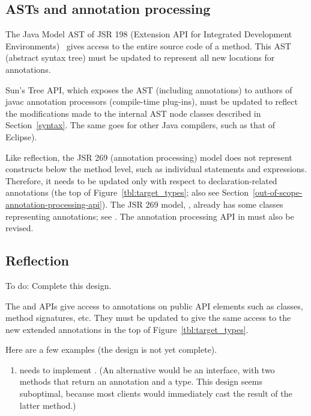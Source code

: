 \documentclass[10pt]{article}
\begin{document}
\subsection{ASTs and annotation processing\label{asts-and-annotation-processing}}

The Java Model AST of JSR 198 (Extension API for Integrated Development
Environments)~\cite{JSR198} gives access to the entire source code of a
method.  This AST (abstract syntax tree) must be updated to represent all
new locations for annotations.

Sun's Tree API, which exposes the AST (including annotations) to authors of
javac annotation processors (compile-time plug-ins), must be updated to
reflect the modifications made to the internal AST node classes described in
Section~\ref{syntax}.
The same goes for other Java compilers, such as that of Eclipse).


\label{jsr269-changes}

Like reflection, the JSR 269 (annotation processing) model
does not represent constructs below the
method level, such as individual statements and expressions.  Therefore, it
needs to be updated only with respect to declaration-related annotations
(the top of Figure~\ref{tbl:target_types}; also see Section~\ref{out-of-scope-annotation-processing-api}).
The JSR 269 model, ,
already has some classes representing annotations; see
.
The annotation processing API in  must
also be revised.




\subsection{Reflection\label{reflection}}

To do:  Complete this design.

The  and  APIs give access
to annotations on public API elements such as classes,
method signatures, etc.  They must be updated to give the same
access to the new extended annotations in the top of
Figure~\ref{tbl:target_types}.

Here are a few examples (the design is not yet complete).

\begin{enumerate}
\item
{} needs to implement
.
(An alternative would be an 
interface, with two methods that return an annotation and a type.  This
design seems suboptimal, because most
clients would immediately cast the result of the latter method.)

\end{enumerate}
\end{document}
